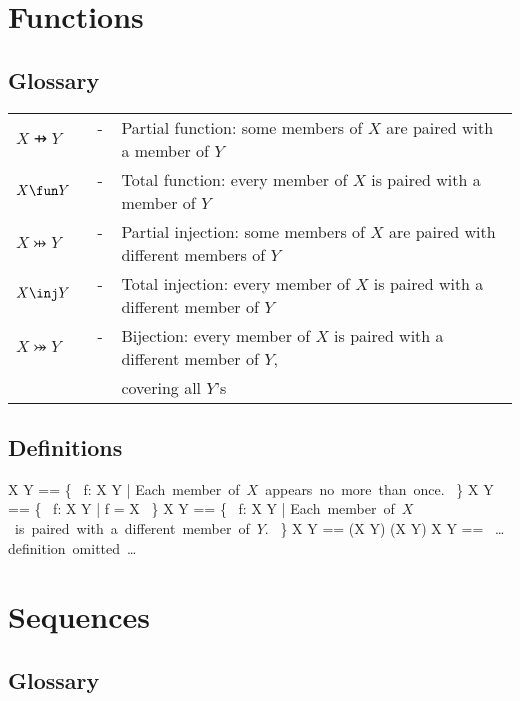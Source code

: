 \documentclass{article}
\begin{document}
\newpage

\section*{Functions}

\subsection*{Glossary}

\begin{tabular}{l c l}
$X \pfun Y$ & ~-~ & Partial function: some members of $X$ are paired with a member of $Y$ \\
$X \fun Y$ & ~-~ & Total function: every member of $X$ is paired with a member of $Y$ \\
$X \pinj Y$ & ~-~ & Partial injection:  some members of $X$ are paired with different members of $Y$ \\
$X \inj Y$ & ~-~ & Total injection: every member of $X$ is paired with a different member of $Y$ \\
$X \bij Y$ & ~-~ & Bijection: every member of $X$ is paired with a different member of $Y$, \\
	& & covering all $Y$'s \\
\end{tabular}

\subsection*{Definitions}

\begin{zed}
 X \pfun Y == \{~ f: X \rel Y | \mbox{Each member of $X$ appears no more than once.} ~\}
\also
 X \fun Y == \{~ f: X \pfun Y | \dom f = X ~\}
\also
 X \pinj Y == \{~ f: X \pfun Y | \mbox{Each member of $X$ is paired with a different member of $Y$.} ~\}
\also
 X \inj Y == (X \pinj Y) \cap (X \fun Y)
\also
 X \bij Y == \mbox{ \dots definition omitted \dots }
\end{zed}

\newpage

\section*{Sequences}

\subsection*{Glossary}
\end{document}
